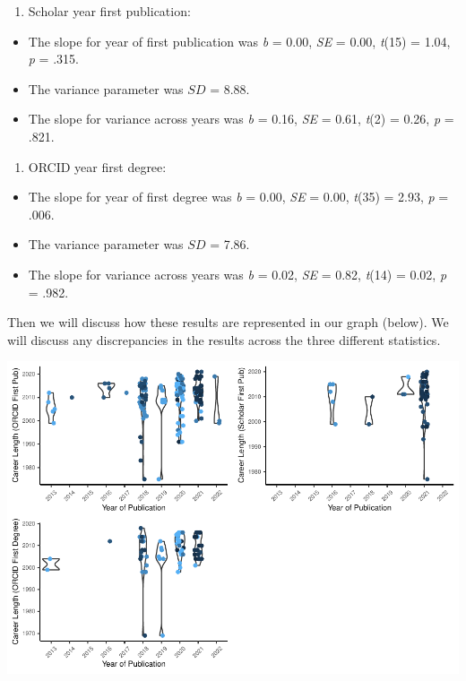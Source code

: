 \documentclass[
  english,
  man]{apa6}
\providecommand{\tightlist}{%
  \setlength{\itemsep}{0pt}\setlength{\parskip}{0pt}}
\begin{document}
\begin{enumerate}
\def\labelenumi{\arabic{enumi})}
\setcounter{enumi}{1}
\tightlist
\item
  Scholar year first publication:
\end{enumerate}

\begin{itemize}
\tightlist
\item
  The slope for year of first publication was \emph{b} = 0.00, \emph{SE} = 0.00, \emph{t}(15) = 1.04, \emph{p} = .315.
\item
  The variance parameter was \(SD\) = 8.88.
\item
  The slope for variance across years was \emph{b} = 0.16, \emph{SE} = 0.61, \emph{t}(2) = 0.26, \emph{p} = .821.
\end{itemize}

\begin{enumerate}
\def\labelenumi{\arabic{enumi})}
\setcounter{enumi}{2}
\tightlist
\item
  ORCID year first degree:
\end{enumerate}

\begin{itemize}
\tightlist
\item
  The slope for year of first degree was \emph{b} = 0.00, \emph{SE} = 0.00, \emph{t}(35) = 2.93, \emph{p} = .006.
\item
  The variance parameter was \(SD\) = 7.86.
\item
  The slope for variance across years was \emph{b} = 0.02, \emph{SE} = 0.82, \emph{t}(14) = 0.02, \emph{p} = .982.
\end{itemize}

Then we will discuss how these results are represented in our graph (below). We will discuss any discrepancies in the results across the three different statistics.

\includegraphics{04.manuscript_files/figure-latex/figure2-1.pdf}
\end{document}
